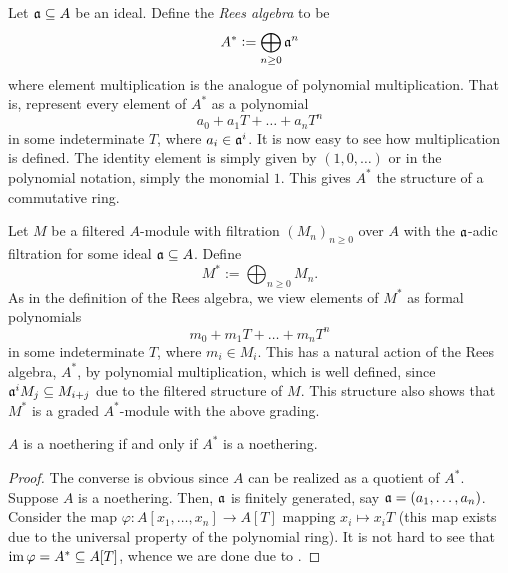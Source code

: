 \begin{definition}
    Let $\mathfrak a\subseteq A$ be an ideal. Define the \emph{Rees algebra} to be 
    \begin{equation*}
        A^\ast := \bigoplus_{n\ge 0}\mathfrak a^n
    \end{equation*}
    where element multiplication is the analogue of polynomial multiplication. That is, represent every element of $A^\ast$ as a polynomial
    \begin{equation*}
        a_0 + a_1T + \dots + a_nT^n
    \end{equation*}
    in some indeterminate $T$, where $a_i\in\mathfrak a^i$. It is now easy to see how multiplication is defined. The identity element is simply given by $(1,0,\dots)$ or in the polynomial notation, simply the monomial $1$. This gives $A^\ast$ the structure of a commutative ring.
\end{definition}

\begin{definition}
    Let $M$ be a filtered $A$-module with filtration $(M_n)_{n\ge 0}$ over $A$ with the $\mathfrak a$-adic filtration for some ideal $\mathfrak a\subseteq A$. Define 
    \begin{equation*}
        M^\ast := \bigoplus_{n\ge 0} M_n.
    \end{equation*}
    As in the definition of the Rees algebra, we view elements of $M^\ast$ as formal polynomials 
    \begin{equation*}
        m_0 + m_1T + \dots + m_nT^n
    \end{equation*}
    in some indeterminate $T$, where $m_i\in M_i$. This has a natural action of the Rees algebra, $A^\ast$, by polynomial multiplication, which is well defined, since $\mathfrak a^iM_j\subseteq M_{i + j}$ due to the filtered structure of $M$. This structure also shows that $M^\ast$ is a graded $A^\ast$-module with the above grading.
\end{definition}

\begin{proposition}
    $A$ is a noethering if and only if $A^\ast$ is a noethering.
\end{proposition}
\begin{proof}
    The converse is obvious since $A$ can be realized as a quotient of $A^\ast$. Suppose $A$ is a noethering. Then, $\mathfrak a$ is finitely generated, say $\mathfrak a = (a_1,\dots,a_n)$. Consider the map $\varphi: A[x_1,\dots,x_n]\to A[T]$ mapping $x_i\mapsto x_iT$ (this map exists due to the universal property of the polynomial ring). It is not hard to see that $\operatorname{im}\varphi = A^\ast\subseteq A[T]$, whence we are done due to .
\end{proof}


